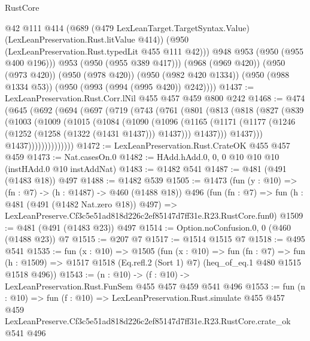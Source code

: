 \begin{lexlean}{RustCore}
\begin{coremodule}
              @42
              @111
              @414
              (@689
                (@479 LexLeanTarget.TargetSyntax.Value)
                (LexLeanPreservation.Rust.litValue @414))
              (@950 (LexLeanPreservation.Rust.typedLit @455 @111 @42)))
            @948
            @953
            (@950 (@955 @400 @196)))
          @953
          (@950 (@955 @389 @417)))
        (@968 (@969 @420))
        (@950 (@973 @420))
        (@950 (@978 @420))
        (@950 (@982 @420 @1334))
        (@950 (@988 @1334 @53))
        (@950 (@993 (@994 (@995 @420)) @242))))
@1437 := LexLeanPreservation.Rust.Corr.lNil @455 @457 @459 @800 @242
@1468 := @474
    (@645
      (@692
        (@694
          (@697
            (@719
              (@743
                (@761
                  (@801
                    (@813
                      (@818
                        (@827
                          (@839
                            (@1003
                              (@1009
                                (@1015
                                  (@1084
                                    (@1090
                                      (@1096
                                        (@1165
                                          (@1171
                                            (@1177
                                              (@1246 (@1252 (@1258 (@1322 (@1431 @1437))) @1437)))
                                            @1437)))
                                      @1437)))
                                @1437))))))))))))))
@1472 := LexLeanPreservation.Rust.CrateOK @455 @457 @459
@1473 := Nat.casesOn.{0}
@1482 := HAdd.hAdd.{0, 0, 0} @10 @10 @10 (instHAdd.{0} @10 instAddNat)
@1483 := @1482 @541
@1487 := @481 (@491 (@1483 @18)) @497
@1488 := @1482 @539
@1505 := @1473
    (fun (y : @10) => (fn : @7) -> (h : @1487) -> @460 (@1488 @18))
    @496
    (fun (fn : @7) =>
    fun (h : @481 (@491 (@1482 Nat.zero @18)) @497) =>
    LexLeanPreserve.Cf3c5e51ad818d226c2ef85147d7ff31e.R23.RustCore.fun0)
@1509 := @481 (@491 (@1483 @23)) @497
@1514 := Option.noConfusion.{0, 0} (@460 (@1488 @23)) @7
@1515 := @207 @7
@1517 := @1514 @1515 @7
@1518 := @495 @541
@1535 := fun (x : @10) =>
  @1505
    (fun (x : @10) =>
    fun (fn : @7) =>
    fun (h : @1509) => @1517 @1518 (Eq.refl.{2} (Sort 1) @7) (heq_of_eq.{1} @480 @1515 @1518 @496))
@1543 := (n : @10) -> (f : @10) -> LexLeanPreservation.Rust.FunSem @455 @457 @459 @541 @496
@1553 := fun (n : @10) =>
  fun (f : @10) =>
  LexLeanPreservation.Rust.simulate
    @455
    @457
    @459
    LexLeanPreserve.Cf3c5e51ad818d226c2ef85147d7ff31e.R23.RustCore.crate_ok
    @541
    @496
\end{coremodule}
\end{lexlean}
